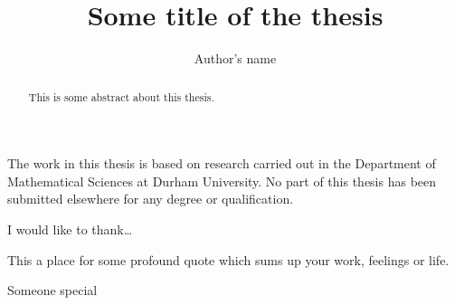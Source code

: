 \documentclass[twoside,openright,frontopenright]{dmathesis}
\begin{document}
\title{Some title of the thesis}
\author{Author's name}
\maketitlepage*

\begin{abstract}
%
	This is some abstract about this thesis.
%
\end{abstract}

\begin{declaration*}
%
	The work in this thesis is based on research carried out in the Department of
	Mathematical Sciences at Durham University. No part of this thesis has been
	submitted elsewhere for any degree or qualification.
%
\end{declaration*}

\begin{acknowledgements*}
%
	I would like to thank\ldots
%
\end{acknowledgements*}

\begin{epigraph*}
%
	This a place for some profound quote which sums up your work, feelings or
	life.
%
\end{epigraph*}

\begin{dedication*}
%
	Someone special
%
\end{dedication*}

\disableprotrusion
\tableofcontents*
\listoffigures
\listoftables
\enableprotrusion

\cleardoublepage
{}

%
%
%
%
%

\appendix
%
%

\nocite{*}
\printbibliography[heading=bibintoc]
\end{document}
